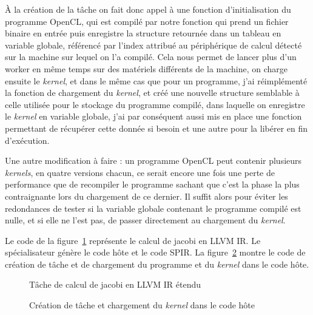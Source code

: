À la création de la tâche on fait donc appel à une fonction d'initialisation du
programme OpenCL, qui est compilé par notre fonction qui prend un fichier
binaire en entrée puis enregistre la structure retournée dans un tableau en
variable globale, référencé par l'index attribué au périphérique de calcul
détecté sur la machine sur lequel on l'a compilé. Cela nous permet de lancer
plus d'un worker en même temps sur des matériels différents de la machine, on
charge ensuite le \emph{kernel}, et dans le même cas que pour un programme, j'ai
réimplémenté la fonction de chargement du \emph{kernel}, et créé une
nouvelle structure semblable à celle utilisée pour le stockage du programme
compilé, dans laquelle on enregistre le \emph{kernel} en variable globale, j'ai
par conséquent aussi mis en place une fonction permettant de récupérer cette
donnée si besoin et une autre pour la libérer en fin d'exécution.

Une autre modification à faire : un programme OpenCL peut contenir plusieurs
\emph{kernels}, en quatre versions chacun, ce serait encore une fois une perte
de performance que de recompiler le programme sachant que c'est la phase la plus
contraignante lors du chargement de ce dernier. Il suffit alors pour éviter les
redondances de tester si la variable globale contenant le programme compilé est
nulle, et si elle ne l'est pas, de passer directement au chargement du
\emph{kernel}.

Le code de la figure~\ref{calc_jacobi} représente le calcul de jacobi en LLVM
IR. Le spécialisateur génère le code hôte et le code SPIR. La
figure~\ref{jacobi_task_create} montre le code de création de tâche et de
chargement du programme et du \emph{kernel} dans le code hôte.

\begin{figure}[]
   
   \caption{Tâche de calcul de jacobi en LLVM IR étendu}
   \label{calc_jacobi}
\end{figure}

\begin{figure}[]
   
   \caption{Création de tâche et chargement du \emph{kernel} dans le code hôte}
   \label{jacobi_task_create}
\end{figure}
\clearpage

